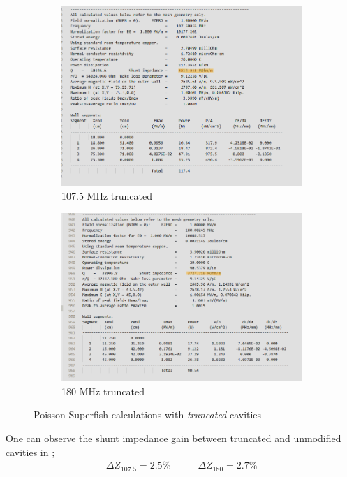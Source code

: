 \documentclass{article}
\begin{document}
\begin{figure}[H]
    \centering
    \begin{subfigure}{.5\textwidth}
      \centering
      \includegraphics[width=0.95\linewidth]{../../../figures/superfish/superfish107mod_z_highlighted.png}
      \caption{107.5 MHz truncated}
    \end{subfigure}%
    \begin{subfigure}{.5\textwidth}
      \centering
      \includegraphics[width=\linewidth]{../../../figures/superfish/superfish180mod_z_highlighted.png}
      \caption{180 MHz truncated}
    \end{subfigure}
    \caption{Poisson Superfish calculations with \textit{truncated} cavities}
    \label{fig:180_cavity_shunt_diff}
\end{figure}
One can observe the shunt impedance gain between truncated and unmodified cavities in ;
\begin{equation*}
    \begin{aligned}
        \Delta Z_{107.5}=2.5\%
    \end{aligned}
    \qquad
    \begin{aligned}
        \Delta Z_{180}=2.7\%
    \end{aligned}
\end{equation*}

\end{document}
